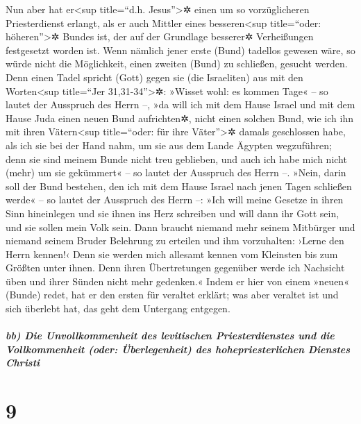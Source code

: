  Nun aber hat er\textless sup title=``d.h.
Jesus''\textgreater✲ einen um so vorzüglicheren Priesterdienst erlangt,
als er auch Mittler eines besseren\textless sup title=``oder:
höheren''\textgreater✲ Bundes ist, der auf der Grundlage besserer✲
Verheißungen festgesetzt worden ist.  Wenn nämlich jener
erste (Bund) tadellos gewesen wäre, so würde nicht die Möglichkeit,
einen zweiten (Bund) zu schließen, gesucht werden.  Denn
einen Tadel spricht (Gott) gegen sie (die Israeliten) aus mit den
Worten\textless sup title=``Jer 31,31-34''\textgreater✲: »Wisset wohl:
es kommen Tage« -- so lautet der Ausspruch des Herrn --, »da will ich
mit dem Hause Israel und mit dem Hause Juda einen neuen Bund
aufrichten✲,  nicht einen solchen Bund, wie ich ihn mit
ihren Vätern\textless sup title=``oder: für ihre Väter''\textgreater✲
damals geschlossen habe, als ich sie bei der Hand nahm, um sie aus dem
Lande Ägypten wegzuführen; denn sie sind meinem Bunde nicht treu
geblieben, und auch ich habe mich nicht (mehr) um sie gekümmert« -- so
lautet der Ausspruch des Herrn --.  »Nein, darin soll der
Bund bestehen, den ich mit dem Hause Israel nach jenen Tagen schließen
werde« -- so lautet der Ausspruch des Herrn --: »Ich will meine Gesetze
in ihren Sinn hineinlegen und sie ihnen ins Herz schreiben und will dann
ihr Gott sein, und sie sollen mein Volk sein.  Dann
braucht niemand mehr seinem Mitbürger und niemand seinem Bruder
Belehrung zu erteilen und ihm vorzuhalten: ›Lerne den Herrn kennen!‹
Denn sie werden mich allesamt kennen vom Kleinsten bis zum Größten unter
ihnen.  Denn ihren Übertretungen gegenüber werde ich
Nachsicht üben und ihrer Sünden nicht mehr gedenken.« 
Indem er hier von einem »neuen« (Bunde) redet, hat er den ersten für
veraltet erklärt; was aber veraltet ist und sich überlebt hat, das geht
dem Untergang entgegen.

\hypertarget{bb-die-unvollkommenheit-des-levitischen-priesterdienstes-und-die-vollkommenheit-oder-uxfcberlegenheit-des-hohepriesterlichen-dienstes-christi}{%
\subparagraph{bb) Die Unvollkommenheit des levitischen Priesterdienstes
und die Vollkommenheit (oder: Überlegenheit) des hohepriesterlichen
Dienstes
Christi}\label{bb-die-unvollkommenheit-des-levitischen-priesterdienstes-und-die-vollkommenheit-oder-uxfcberlegenheit-des-hohepriesterlichen-dienstes-christi}}

\hypertarget{section-8}{%
\section{9}\label{section-8}}

